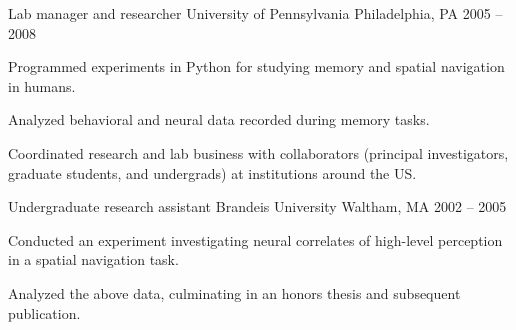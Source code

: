 \begin{cventries}
  \cventry
    {Lab manager and researcher} %
    {University of Pennsylvania} %
    {Philadelphia, PA} %
    {2005 -- 2008} %
    {
      \begin{cvitems} %
        \item {Programmed experiments in Python for studying memory and spatial navigation in humans.}
        \item {Analyzed behavioral and neural data recorded during memory tasks.}
        \item {Coordinated research and lab business with collaborators (principal investigators, graduate students, and undergrads) at institutions around the US.}
      \end{cvitems}
    }

  \cventry
    {Undergraduate research assistant} %
    {Brandeis University} %
    {Waltham, MA} %
    {2002 -- 2005} %
    {
      \begin{cvitems} %
        \item {Conducted an experiment investigating neural correlates of high-level perception in a spatial navigation task.}
        \item {Analyzed the above data, culminating in an honors thesis and subsequent publication.}
      \end{cvitems}
    }

\end{cventries}
